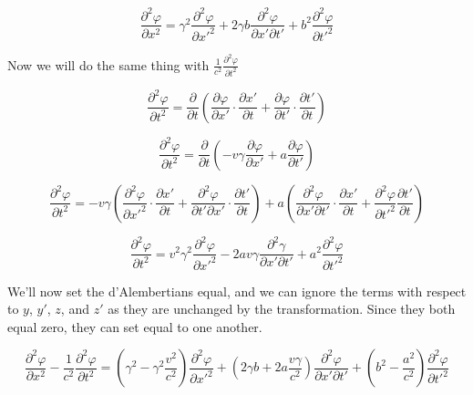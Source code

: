 \documentclass{article}
\begin{document}
\begin{equation}
\frac{\partial^2{\varphi}}{\partial{x}^2} = \gamma^2\frac{\partial^2{\varphi}}{\partial{x'}^2} + 2\gamma b\frac{\partial^2{\varphi}}{\partial{x'}\partial{t'}} + b^2\frac{\partial^2{\varphi}}{\partial{t'}^2}
\end{equation}

\bigskip

Now we will do the same thing with $\frac{1}{c^2}\frac{\partial^2{\varphi}}{\partial{t}^2}$

\begin{equation}
\frac{\partial^2{\varphi}}{\partial{t}^2} = \frac{\partial}{\partial{t}}\left(\frac{\partial{\varphi}}{\partial{x'}}\cdot\frac{\partial{x'}}{\partial{t}} + \frac{\partial{\varphi}}{\partial{t'}}\cdot\frac{\partial{t'}}{\partial{t}} \right)
\end{equation}

\begin{equation}
\frac{\partial^2{\varphi}}{\partial{t}^2} = \frac{\partial}{\partial{t}} \left( -v\gamma\frac{\partial{\varphi}}{\partial{x'}} + a\frac{\partial{\varphi}}{\partial{t'}} \right)
\end{equation}

\begin{equation}
\frac{\partial^2{\varphi}}{\partial{t}^2} = -v\gamma\left(\frac{\partial^2{\varphi}}{\partial{x'}^2}\cdot\frac{\partial{x'}}{\partial{t}} + \frac{\partial^2{\varphi}}{\partial{t'}\partial{x'}}\cdot \frac{\partial{t'}}{\partial{t}} \right) + a\left( \frac{\partial^2{\varphi}}{\partial{x'}\partial{t'}}\cdot \frac{\partial{x'}}{\partial{t}} + \frac{\partial^2{\varphi}}{\partial{t'}^2}\frac{\partial{t'}}{\partial{t}}\right)
\end{equation}

\begin{equation}
\frac{\partial^2{\varphi}}{\partial{t}^2} = v^2\gamma^2\frac{\partial^2{\varphi}}{\partial{x'}^2} - 2av\gamma\frac{\partial^2{\gamma}}{\partial{x'}\partial{t'}} + a^2\frac{\partial^2{\varphi}}{\partial{t'}^2}
\end{equation}

\smallskip

We'll now set the d'Alembertians equal, and we can ignore the terms with respect to $y$, $y'$, $z$, and $z'$ as they are unchanged by the transformation. Since they both equal zero, they can set equal to one another.

\begin{equation}
\frac{\partial^2{\varphi}}{\partial{x}^2} - \frac{1}{c^2}\frac{\partial^2{\varphi}}{\partial{t}^2} = \left( \gamma^2 - \gamma^2\frac{v^2}{c^2} \right)\frac{\partial^2{\varphi}}{\partial{x'}^2} + \left( 2\gamma b + 2a\frac{v\gamma}{c^2}\right)\frac{\partial^2{\varphi}}{\partial{x'}\partial{t'}} + \left( b^2 - \frac{a^2}{c^2} \right)\frac{\partial^2{\varphi}}{\partial{t'}^2}
\end{equation}
\end{document}
